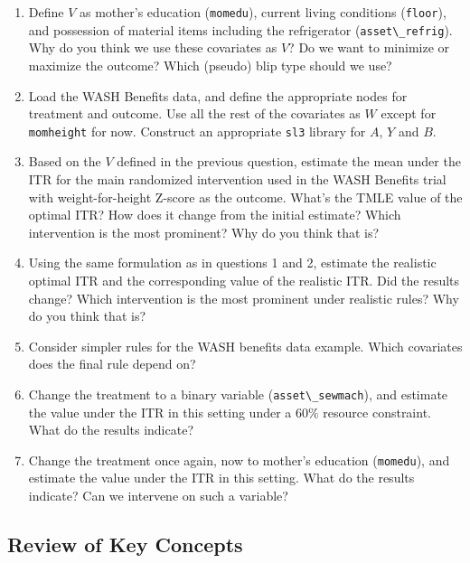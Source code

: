 \documentclass[
  12pt, krantz2,
]{krantz}
\newcommand{\passthrough}[1]{#1}
\newcommand{\1}{\mathbbm{1}}
\theoremstyle{definition}
\theoremstyle{definition}
\theoremstyle{definition}
\theoremstyle{definition}
\theoremstyle{remark}
\begin{document}
\begin{enumerate}
\def\labelenumi{\arabic{enumi}.}
\item
  Define \(V\) as mother's education (\passthrough{\lstinline!momedu!}), current living conditions (\passthrough{\lstinline!floor!}),
  and possession of material items including the refrigerator (\passthrough{\lstinline!asset\_refrig!}).
  Why do you think we use these covariates as \(V\)? Do we want to minimize or
  maximize the outcome? Which (pseudo) blip type should we use?
\item
  Load the WASH Benefits data, and define the appropriate nodes for treatment
  and outcome. Use all the rest of the covariates as \(W\) except for
  \passthrough{\lstinline!momheight!} for now. Construct an appropriate \passthrough{\lstinline!sl3!} library for \(A\), \(Y\) and
  \(B\).
\item
  Based on the \(V\) defined in the previous question, estimate the mean under
  the ITR for the main randomized intervention used in the WASH Benefits trial
  with weight-for-height Z-score as the outcome. What's the TMLE value of the
  optimal ITR? How does it change from the initial estimate? Which
  intervention is the most prominent? Why do you think that is?
\item
  Using the same formulation as in questions 1 and 2, estimate the realistic
  optimal ITR and the corresponding value of the realistic ITR. Did the results
  change? Which intervention is the most prominent under realistic rules? Why do
  you think that is?
\item
  Consider simpler rules for the WASH benefits data example. Which covariates does the
  final rule depend on?
\item
  Change the treatment to a binary variable (\passthrough{\lstinline!asset\_sewmach!}), and estimate the
  value under the ITR in this setting under a \(60\%\) resource constraint. What
  do the results indicate?
\item
  Change the treatment once again, now to mother's education (\passthrough{\lstinline!momedu!}), and
  estimate the value under the ITR in this setting. What do the results
  indicate? Can we intervene on such a variable?
\end{enumerate}

\hypertarget{review-of-key-concepts-1}{%
\subsection{Review of Key Concepts}\label{review-of-key-concepts-1}}
\end{document}
